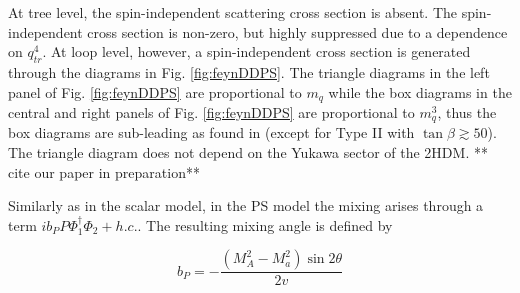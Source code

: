 At tree level, the spin-independent scattering cross section is absent. The spin-independent cross section is non-zero, but highly suppressed due to a dependence on $q_{tr}^4$. At loop level, however, a spin-independent cross section is generated through the diagrams in Fig. \ref{fig:feynDDPS}. 
The triangle diagrams in the left panel of Fig. \ref{fig:feynDDPS} are proportional to $m_q$ while the box diagrams in the central and right panels of Fig. \ref{fig:feynDDPS} are proportional to $m_q^3$, thus the box diagrams are sub-leading as found in \citep{Ipek:2014gua} (except for Type II with $\tan\beta\gtrsim50$).
The triangle diagram does not depend on the Yukawa sector of the 2HDM. ** cite our paper in preparation**

Similarly as in the scalar model, in the PS model the mixing arises through a term $i b_P P \Phi_1^\dagger \Phi_2 +h.c.$. The resulting mixing angle is defined by

\begin{equation}
    b_P = -\frac{(M_A^2-M_a^2)\sin2\theta}{2v}
\end{equation}




